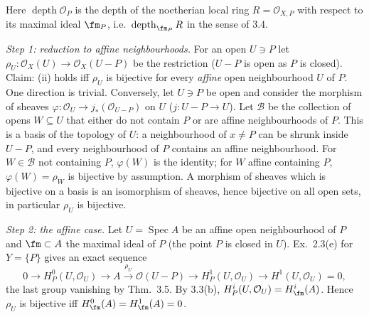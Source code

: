 \documentclass[11pt]{article}
\begin{document}
\pf
Here $\operatorname{depth}\mathcal O_P$ is the depth of the noetherian local ring $R=\mathcal O_{X,P}$ with respect to its maximal ideal $\fm_P$, i.e.\ $\operatorname{depth}_{\fm_P}R$ in the sense of 3.4.

\emph{Step 1: reduction to affine neighbourhoods.} For an open $U\ni P$ let $\rho_U:\mathcal O_X(U)\to\mathcal O_X(U-P)$ be the restriction ($U-P$ is open as $P$ is closed). Claim: (ii) holds iff $\rho_U$ is bijective for every \emph{affine} open neighbourhood $U$ of $P$. One direction is trivial. Conversely, let $U\ni P$ be open and consider the morphism of sheaves $\varphi:\mathcal O_U\to j_*(\mathcal O_{U-P})$ on $U$ ($j:U-P\to U$). Let $\mathcal B$ be the collection of opens $W\subseteq U$ that either do not contain $P$ or are affine neighbourhoods of $P$. This is a basis of the topology of $U$: a neighbourhood of $x\neq P$ can be shrunk inside $U-P$, and every neighbourhood of $P$ contains an affine neighbourhood. For $W\in\mathcal B$ not containing $P$, $\varphi(W)$ is the identity; for $W$ affine containing $P$, $\varphi(W)=\rho_W$ is bijective by assumption. A morphism of sheaves which is bijective on a basis is an isomorphism of sheaves, hence bijective on all open sets, in particular $\rho_U$ is bijective.

\emph{Step 2: the affine case.} Let $U=\operatorname{Spec}A$ be an affine open neighbourhood of $P$ and $\fm\subset A$ the maximal ideal of $P$ (the point $P$ is closed in $U$). Ex.~2.3(e) for $Y=\{P\}$ gives an exact sequence
\[
0\to H^0_P(U,\mathcal O_U)\to A\xrightarrow{\rho_U}\mathcal O(U-P)\to H^1_P(U,\mathcal O_U)\to H^1(U,\mathcal O_U)=0,
\]
the last group vanishing by Thm.~3.5. By 3.3(b), $H^i_P(U,\mathcal O_U)=H^i_{\fm}(A)$. Hence $\rho_U$ is bijective iff $H^0_{\fm}(A)=H^1_{\fm}(A)=0$.
\end{document}
